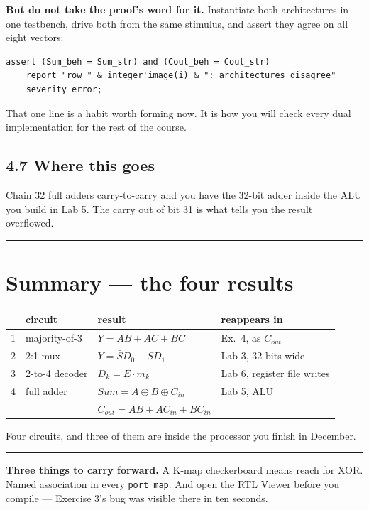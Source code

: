 \documentclass[11pt]{article}
\newcommand{\code}[1]{\texttt{#1}}
\newcommand{\hr}{\vspace{2pt}\hrule\vspace{6pt}}
\begin{document}
\textbf{But do not take the proof's word for it.} Instantiate both architectures in
one testbench, drive both from the same stimulus, and assert they agree on all eight
vectors:

\begin{lstlisting}
assert (Sum_beh = Sum_str) and (Cout_beh = Cout_str)
    report "row " & integer'image(i) & ": architectures disagree"
    severity error;
\end{lstlisting}

That one line is a habit worth forming now. It is how you will check every dual
implementation for the rest of the course.

\subsection*{4.7 Where this goes}

Chain 32 full adders carry-to-carry and you have the 32-bit adder inside the ALU you
build in Lab 5. The carry out of bit 31 is what tells you the result overflowed.

\vspace{6pt}\hr

\section*{Summary --- the four results}

\begin{center}
\begin{tabular}{clll}
\toprule
& circuit & result & reappears in \\
\midrule
1 & majority-of-3 & $Y = AB + AC + BC$ & Ex.\ 4, as $C_{out}$ \\
2 & 2:1 mux & $Y = \bar{S}D_0 + SD_1$ & Lab 3, 32 bits wide \\
3 & 2-to-4 decoder & $D_k = E \cdot m_k$ & Lab 6, register file writes \\
4 & full adder & $Sum = A \oplus B \oplus C_{in}$ & Lab 5, ALU \\
  &             & $C_{out} = AB + AC_{in} + BC_{in}$ & \\
\bottomrule
\end{tabular}
\end{center}

Four circuits, and three of them are inside the processor you finish in December.

\vspace{4pt}
\hr
{\small \textbf{Three things to carry forward.} A K-map checkerboard means reach for
XOR. Named association in every \code{port map}. And open the RTL Viewer before you
compile --- Exercise 3's bug was visible there in ten seconds.}
\end{document}

